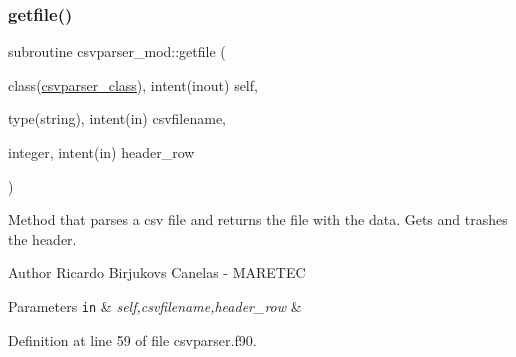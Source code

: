 \subsubsection{\texorpdfstring{getfile()}{getfile()}}
{\footnotesize\ttfamily subroutine csvparser\+\_\+mod\+::getfile (\begin{DoxyParamCaption}\item[{class(\mbox{\hyperlink{structcsvparser__mod_1_1csvparser__class}{csvparser\+\_\+class}}), intent(inout)}]{self,  }\item[{type(string), intent(in)}]{csvfilename,  }\item[{integer, intent(in)}]{header\+\_\+row }\end{DoxyParamCaption})\hspace{0.3cm}{\ttfamily [private]}}



Method that parses a csv file and returns the file with the data. Gets and trashes the header. 

\begin{DoxyAuthor}{Author}
Ricardo Birjukovs Canelas -\/ M\+A\+R\+E\+T\+EC 
\end{DoxyAuthor}

\begin{DoxyParams}[1]{Parameters}
\mbox{\tt in}  & {\em self,csvfilename,header\+\_\+row} & \\
\hline
\end{DoxyParams}


Definition at line 59 of file csvparser.\+f90.


